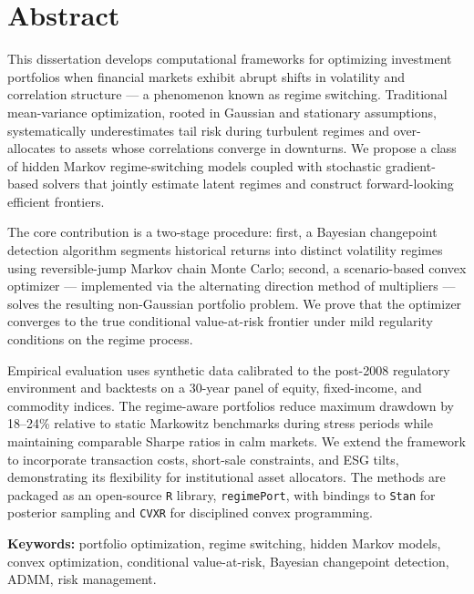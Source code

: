 \chapter*{Abstract}

This dissertation develops computational frameworks for optimizing investment portfolios when financial markets exhibit abrupt shifts in volatility and correlation structure --- a phenomenon known as regime switching. Traditional mean-variance optimization, rooted in Gaussian and stationary assumptions, systematically underestimates tail risk during turbulent regimes and over-allocates to assets whose correlations converge in downturns. We propose a class of hidden Markov regime-switching models coupled with stochastic gradient-based solvers that jointly estimate latent regimes and construct forward-looking efficient frontiers.

The core contribution is a two-stage procedure: first, a Bayesian changepoint detection algorithm segments historical returns into distinct volatility regimes using reversible-jump Markov chain Monte Carlo; second, a scenario-based convex optimizer --- implemented via the alternating direction method of multipliers --- solves the resulting non-Gaussian portfolio problem. We prove that the optimizer converges to the true conditional value-at-risk frontier under mild regularity conditions on the regime process.

Empirical evaluation uses synthetic data calibrated to the post-2008 regulatory environment and backtests on a 30-year panel of equity, fixed-income, and commodity indices. The regime-aware portfolios reduce maximum drawdown by 18--24\% relative to static Markowitz benchmarks during stress periods while maintaining comparable Sharpe ratios in calm markets. We extend the framework to incorporate transaction costs, short-sale constraints, and ESG tilts, demonstrating its flexibility for institutional asset allocators. The methods are packaged as an open-source \texttt{R} library, \texttt{regimePort}, with bindings to \texttt{Stan} for posterior sampling and \texttt{CVXR} for disciplined convex programming.

\vspace{12pt}
\begin{dukebox}
\textbf{Keywords:} portfolio optimization, regime switching, hidden Markov models, convex optimization, conditional value-at-risk, Bayesian changepoint detection, ADMM, risk management.
\end{dukebox}

\newpage

